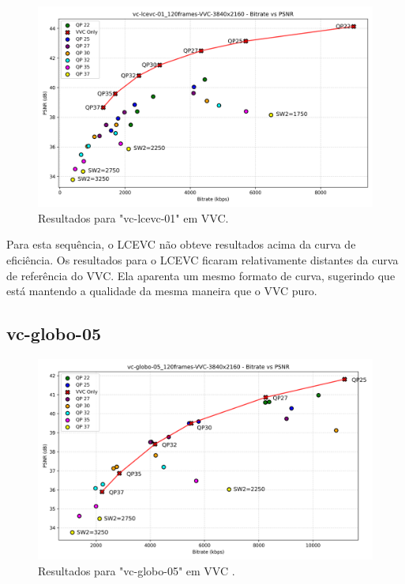 \begin{figure}[h]
    \centering
    \includegraphics[width=1.0\textwidth]{img/vc-lcevc-01_120frames-VVC.png}
    \caption{Resultados para "vc-lcevc-01" em \acrshort{VVC}.}
    \label{fig:vc-lcevc-01-VVC}
\end{figure}

Para esta sequência, o \acrshort{LCEVC} não obteve resultados acima da curva de eficiência.
Os resultados para o \acrshort{LCEVC} ficaram relativamente distantes da curva de referência do 
\acrshort{VVC}. Ela aparenta um mesmo formato de curva, sugerindo que está mantendo a qualidade
da mesma maneira que o \acrshort{VVC} puro.

\newpage
\subsection{vc-globo-05}

\begin{figure}[h]
    \centering
    \includegraphics[width=1.0\textwidth]{img/vc-globo-05_120frames-VVC.png}
    \caption{Resultados para "vc-globo-05" em \acrshort{VVC} \cite{globo_video_uhd}.}
    \label{fig:vc-globo-05-VVC}
\end{figure}

